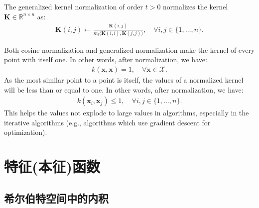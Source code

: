 \documentclass[lang=cn,10pt]{gorgeousnbook}
\numberwithin{equation}{section}%
\numberwithin{figure}{section}%
\begin{document}
\begin{definition}
The generalized kernel normalization of order $t>0$ normalizes the kernel $\boldsymbol{K} \in \mathbb{R}^{n \times n}$ as:
\begin{align}
\boldsymbol{K}(i,j) \gets \frac{\boldsymbol{K}(i,j)}{m_t\big(\boldsymbol{K}(i,i), \boldsymbol{K}(j,j)\big)}, \quad \forall i,j \in \{1, \dots, n\}.
\end{align}
\end{definition}

Both cosine normalization and generalized normalization make the kernel of every point with itself one. In other words, after normalization, we have:
\begin{align}
k(\boldsymbol{x}, \boldsymbol{x}) = 1, \quad \forall \boldsymbol{x} \in \mathcal{X}.
\end{align}
As the most similar point to a point is itself, the values of a normalized kernel will be less than or equal to one. In other words, after normalization, we have:
\begin{align}
k(\boldsymbol{x}_i, \boldsymbol{x}_j) \leq 1, \quad \forall i,j \in \{1, \dots, n\}.
\end{align}
This helps the values not explode to large values in algorithms, especially in the iterative algorithms (e.g., algorithms which use gradient descent for optimization). 


\section{特征(本征)函数} \label{section_eigenfunctions}

\subsection{希尔伯特空间中的内积}
\end{document}
